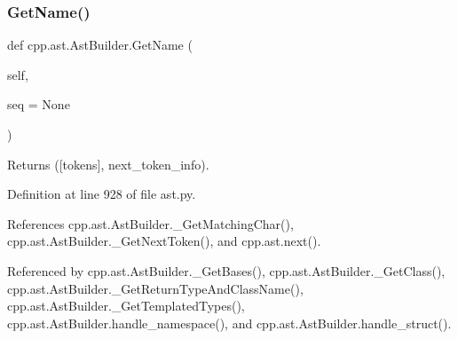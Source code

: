 \subsubsection{\texorpdfstring{Get\+Name()}{GetName()}}
{\footnotesize\ttfamily def cpp.\+ast.\+Ast\+Builder.\+Get\+Name (\begin{DoxyParamCaption}\item[{}]{self,  }\item[{}]{seq = {\ttfamily None} }\end{DoxyParamCaption})}

\begin{DoxyVerb}Returns ([tokens], next_token_info).\end{DoxyVerb}
 

Definition at line 928 of file ast.\+py.



References cpp.\+ast.\+Ast\+Builder.\+\_\+\+Get\+Matching\+Char(), cpp.\+ast.\+Ast\+Builder.\+\_\+\+Get\+Next\+Token(), and cpp.\+ast.\+next().



Referenced by cpp.\+ast.\+Ast\+Builder.\+\_\+\+Get\+Bases(), cpp.\+ast.\+Ast\+Builder.\+\_\+\+Get\+Class(), cpp.\+ast.\+Ast\+Builder.\+\_\+\+Get\+Return\+Type\+And\+Class\+Name(), cpp.\+ast.\+Ast\+Builder.\+\_\+\+Get\+Templated\+Types(), cpp.\+ast.\+Ast\+Builder.\+handle\+\_\+namespace(), and cpp.\+ast.\+Ast\+Builder.\+handle\+\_\+struct().


